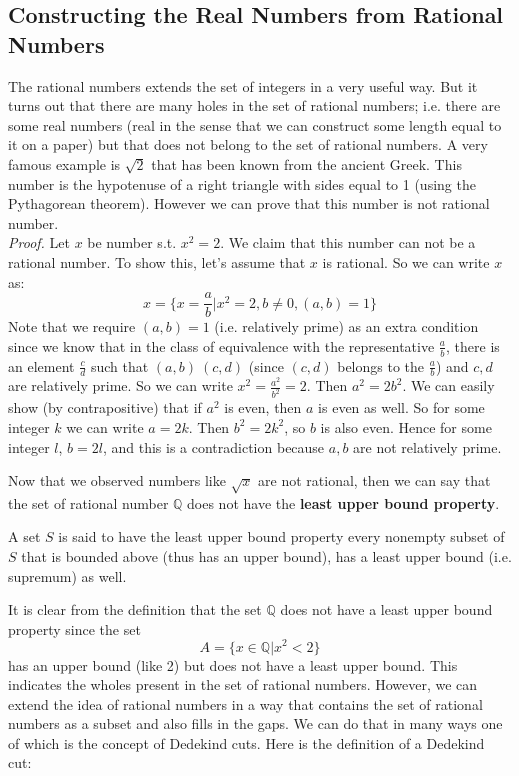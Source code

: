 \subsection{Constructing the Real Numbers from Rational Numbers}

The rational numbers extends the set of integers in a very useful way. But it turns out that there are many holes in the set of rational numbers; i.e. there are some real numbers (real in the sense that we can construct some length equal to it on a paper) but that does not belong to the set of rational numbers. A very famous example is $\sqrt{2}$ that has been known from the ancient Greek. This number is the hypotenuse of a right triangle with sides equal to 1 (using the Pythagorean theorem). However we can prove that this number is not rational number.  \\

\textit{Proof.} Let $x$ be number s.t. $x^2 = 2$. We claim that this number can not be a rational number. To show this, let's assume that $x$ is rational. So we can write $x$ as: 
\[ x = \{ x = \frac{a}{b} | x^2 = 2, b \neq 0,  (a,b) = 1 \}  \]
Note that we require $(a,b)=1$ (i.e. relatively prime) as an extra condition since we know that in the class of equivalence with the representative $\frac{a}{b}$, there is an element $\frac{c}{d}$ such that $(a,b) ~ (c,d) $ (since $(c,d)$ belongs to the $\frac{a}{b}$) and $c,d$ are relatively prime. So we can write $x^2 = \frac{a^2}{b^2} = 2$. Then $a^2 = 2 b^2$. We can easily show (by contrapositive) that if $a^2$ is even, then $a$ is even as well. So for some integer $k$ we can write $a = 2k$. Then $b^2 = 2 k^2$, so $b$ is also even. Hence for some integer $l$, $b = 2l$, and this is a contradiction because $a,b$ are not relatively prime.

Now that we observed numbers like $\sqrt{x}$ are not rational, then we can say that the set of rational number $\mathbb{Q}$ does not have the \textbf{least upper bound property}.

\begin{definition}
	A set $S$ is said to have the least upper bound property every nonempty subset of $S$ that is bounded above (thus has an upper bound), has a least upper bound (i.e. supremum) as well. 
\end{definition}

It is clear from the definition that the set $\mathbb{Q}$ does not have a least upper bound property since the set  \[A =\{ x \in \mathbb{Q} | x^2 < 2 \} \]has an upper bound (like 2) but does not have a least upper bound. This indicates the wholes present in the set of rational numbers. However, we can extend the idea of rational numbers in a way that contains the set of rational numbers as a subset and also fills in the gaps. We can do that in many ways one of which is the concept of Dedekind cuts. Here is the definition of a Dedekind cut:

